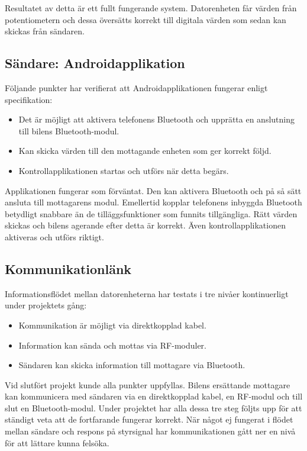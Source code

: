 \documentclass[a4paper]{article}
\begin{document}
\noindent
Resultatet av detta är ett fullt fungerande system. Datorenheten får värden från potentiometern och dessa översätts korrekt till digitala värden som sedan kan skickas från sändaren.


\subsection{Sändare: Androidapplikation}
Följande punkter har verifierat att Androidapplikationen fungerar enligt specifikation:

\begin{itemize}
\item Det är möjligt att aktivera telefonens Bluetooth och upprätta en anslutning till bilens Bluetooth-modul.
\item Kan skicka värden till den mottagande enheten som ger korrekt följd.
\item Kontrollapplikationen startas och utförs när detta begärs.
\end{itemize}

Applikationen fungerar som förväntat. Den kan aktivera Bluetooth och på så sätt ansluta till mottagarens modul. Emellertid kopplar telefonens inbyggda Bluetooth betydligt snabbare än de tilläggsfunktioner som funnits tillgängliga. Rätt värden skickas och bilens agerande efter detta är korrekt. Även kontrollapplikationen aktiveras och utförs riktigt.

\subsection{Kommunikationlänk}
Informationsflödet mellan datorenheterna har testats i tre nivåer kontinuerligt under projektets gång:
\begin{itemize}
\item Kommunikation är möjligt via direktkopplad kabel.
\item Information kan sända och mottas via RF-moduler.
\item Sändaren kan skicka information till mottagare via Bluetooth.
\end{itemize}

\noindent
Vid slutfört projekt kunde alla punkter uppfyllas. Bilens ersättande mottagare kan kommunicera med sändaren via en direktkopplad kabel, en RF-modul och till slut en Bluetooth-modul. Under projektet har alla dessa tre steg följts upp för att ständigt veta att de fortfarande fungerar korrekt. När något ej fungerat i flödet mellan sändare och respons på styrsignal har kommunikationen gått ner en nivå för att lättare kunna felsöka.
\end{document}
